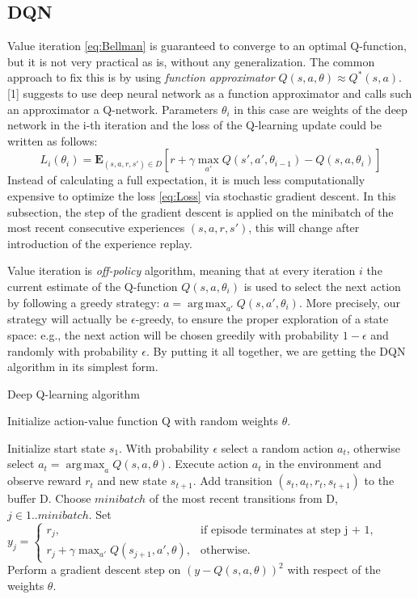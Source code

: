 \documentclass{article}
\DeclareMathOperator*{\argmax}{arg\,max}
\begin{document}
\subsection{DQN}
Value iteration \ref{eq:Bellman} is guaranteed to converge to an optimal Q-function, but it is not very practical as is, without any generalization. The common approach to fix this is by using {\it function approximator} $Q(s, a, \theta) \approx Q^*(s,a)$. [1] suggests to use deep neural network as a function approximator and calls such an approximator a Q-network. Parameters $\theta_i$ in this case are weights of the deep network in the i-th iteration and the loss of the Q-learning update could be written as follows:
\begin{equation}\label{eq:Loss}
L_i(\theta_i) = \mathbf{E}_{(s,a,r,s') \in D}[r + \gamma \max_{a'}Q(s', a', \theta_{i-1}) - Q(s, a, \theta_i)]
\end{equation}
Instead of calculating a full expectation, it is much less computationally expensive to optimize the loss \ref{eq:Loss} via stochastic gradient descent. In this subsection, the step of the gradient descent is applied on the minibatch of the most recent consecutive experiences $(s, a, r, s')$, this will change after introduction of the experience replay.

Value iteration is {\it off-policy} algorithm, meaning that at every iteration $i$ the current estimate of the Q-function $Q(s, a, \theta_i)$ is used to select the next action by following a greedy strategy: $a = \argmax_{a'}Q(s,a',\theta_i)$. More precisely, our strategy will actually be $\epsilon$-greedy, to ensure the proper exploration of a state space: e.g., the next action will be chosen greedily with probability $1 - \epsilon$ and randomly with probability $\epsilon$. By putting it all together, we are getting the DQN algorithm in its simplest form.

\begin{algorithm}[H]
\caption{Deep Q-learning algorithm}
\label{alg1}
Initialize action-value function Q with random weights $\theta$.
\begin{algorithmic}
\STATE Initialize start state $s_1$.
\STATE With probability $\epsilon$ select a random action $a_t$,
\STATE otherwise select $a_t = \argmax_{a}Q(s,a,\theta)$.
\STATE Execute action $a_t$ in the environment and observe reward $r_t$ and new state $s_{t+1}$.
\STATE Add transition $(s_t, a_t, r_t, s_{t+1})$ to the buffer D.
\STATE Choose $minibatch$ of the most recent transitions from D, $j\in1..minibatch$.
\STATE Set $y_j = \begin{cases} r_j, & \mbox{if episode terminates at step j + 1,} \\ r_j + \gamma \max_{a'}Q(s_{j+1}, a', \theta), & \mbox{otherwise.} \end{cases}$
\STATE Perform a gradient descent step on $(y - Q(s, a, \theta))^2$ with respect of the weights $\theta$.
\ENDIF
\ENDFOR
\ENDFOR
\end{algorithmic}
\end{algorithm}
\end{document}
